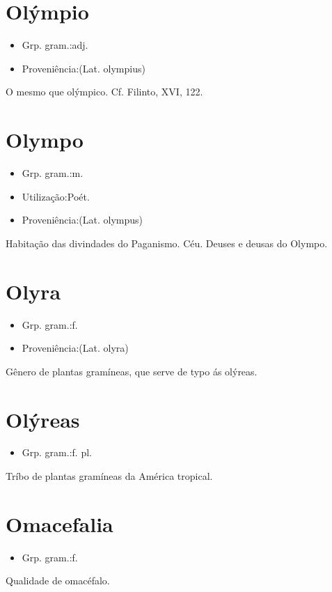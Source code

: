 \section{Olýmpio}
\begin{itemize}
\item {Grp. gram.:adj.}
\end{itemize}
\begin{itemize}
\item {Proveniência:(Lat. \textunderscore olympius\textunderscore )}
\end{itemize}
O mesmo que \textunderscore olýmpico\textunderscore . Cf. Filinto, XVI, 122.
\section{Olympo}
\begin{itemize}
\item {Grp. gram.:m.}
\end{itemize}
\begin{itemize}
\item {Utilização:Poét.}
\end{itemize}
\begin{itemize}
\item {Proveniência:(Lat. \textunderscore olympus\textunderscore )}
\end{itemize}
Habitação das divindades do Paganismo.
Céu.
Deuses e deusas do Olympo.
\section{Olyra}
\begin{itemize}
\item {Grp. gram.:f.}
\end{itemize}
\begin{itemize}
\item {Proveniência:(Lat. \textunderscore olyra\textunderscore )}
\end{itemize}
Gênero de plantas gramíneas, que serve de typo ás olýreas.
\section{Olýreas}
\begin{itemize}
\item {Grp. gram.:f. pl.}
\end{itemize}
Tríbo de plantas gramíneas da América tropical.
\section{Omacefalia}
\begin{itemize}
\item {Grp. gram.:f.}
\end{itemize}
Qualidade de omacéfalo.
